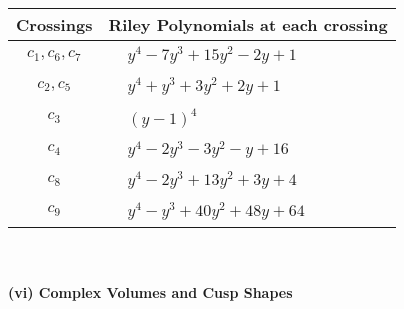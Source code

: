 \documentclass[1p]{elsarticle_modified}
\theoremstyle{definition}
\begin{document}
\begin{tabular}{m{50pt}|m{274pt}}
Crossings & \hspace{64pt}Riley Polynomials at each crossing \\
\hline $$\begin{aligned}c_{1},c_{6},c_{7}\end{aligned}$$&$\begin{aligned}
&y^4-7 y^3+15 y^2-2 y+1
\end{aligned}$\\
\hline $$\begin{aligned}c_{2},c_{5}\end{aligned}$$&$\begin{aligned}
&y^4+y^3+3 y^2+2 y+1
\end{aligned}$\\
\hline $$\begin{aligned}c_{3}\end{aligned}$$&$\begin{aligned}
&(y-1)^4
\end{aligned}$\\
\hline $$\begin{aligned}c_{4}\end{aligned}$$&$\begin{aligned}
&y^4-2 y^3-3 y^2- y+16
\end{aligned}$\\
\hline $$\begin{aligned}c_{8}\end{aligned}$$&$\begin{aligned}
&y^4-2 y^3+13 y^2+3 y+4
\end{aligned}$\\
\hline $$\begin{aligned}c_{9}\end{aligned}$$&$\begin{aligned}
&y^4- y^3+40 y^2+48 y+64
\end{aligned}$\\
\hline
\end{tabular}\\~\\
\newpage\flushleft \textbf{(vi) Complex Volumes and Cusp Shapes}
\end{document}

